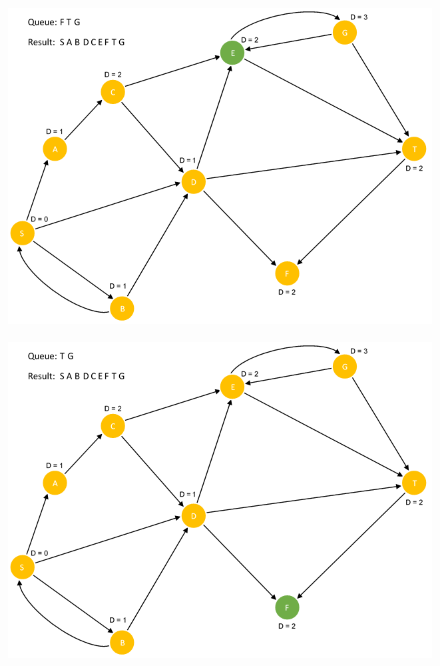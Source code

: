 \documentclass{article}
\begin{document}
\begin{figure}[H]
\centering
\includegraphics[scale=0.6]{images/Q4/14.png}
\end{figure}

\begin{figure}[H]
\centering
\includegraphics[scale=0.6]{images/Q4/15.png}
\end{figure}
\end{document}

